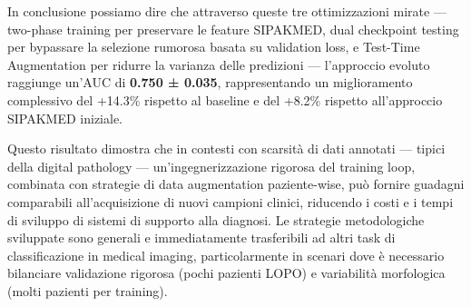 	In conclusione possiamo dire che attraverso queste tre ottimizzazioni mirate — two-phase training per preservare le feature SIPAKMED, dual checkpoint testing per bypassare la selezione rumorosa basata su validation loss, e Test-Time Augmentation per ridurre la varianza delle predizioni — l'approccio evoluto raggiunge un'AUC di \textbf{0.750 ± 0.035}, rappresentando un miglioramento complessivo del +14.3\% rispetto al baseline e del +8.2\% rispetto all'approccio SIPAKMED iniziale.
	
	Questo risultato dimostra che in contesti con scarsità di dati annotati — tipici della digital pathology — un'ingegnerizzazione rigorosa del training loop, combinata con strategie di data augmentation paziente-wise, può fornire guadagni comparabili all'acquisizione di nuovi campioni clinici, riducendo i costi e i tempi di sviluppo di sistemi di supporto alla diagnosi. Le strategie metodologiche sviluppate sono generali e immediatamente trasferibili ad altri task di classificazione in medical imaging, particolarmente in scenari dove è necessario bilanciare validazione rigorosa (pochi pazienti LOPO) e variabilità morfologica (molti pazienti per training).
